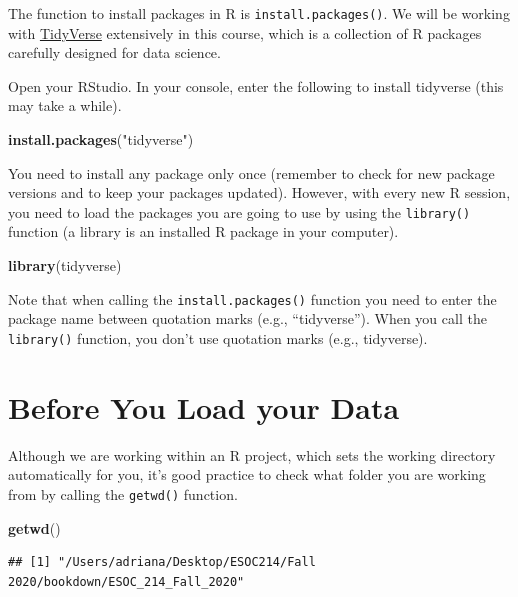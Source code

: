 \documentclass[
]{book}
\newenvironment{Shaded}{\begin{snugshade}}{\end{snugshade}}
\newcommand{\KeywordTok}[1]{\textcolor[rgb]{0.13,0.29,0.53}{\textbf{#1}}}
\newcommand{\NormalTok}[1]{#1}
\newcommand{\StringTok}[1]{\textcolor[rgb]{0.31,0.60,0.02}{#1}}
\begin{document}
The function to install packages in R is \texttt{install.packages()}. We will be working with \href{https://www.tidyverse.org/}{TidyVerse} extensively in this course, which is a collection of R packages carefully designed for data science.

Open your RStudio. In your console, enter the following to install tidyverse (this may take a while).

\begin{Shaded}
\begin{Highlighting}[]
\KeywordTok{install.packages}\NormalTok{(}\StringTok{"tidyverse"}\NormalTok{)}
\end{Highlighting}
\end{Shaded}

You need to install any package only once (remember to check for new package versions and to keep your packages updated). However, with every new R session, you need to load the packages you are going to use by using the \texttt{library()} function (a library is an installed R package in your computer).

\begin{Shaded}
\begin{Highlighting}[]
\KeywordTok{library}\NormalTok{(tidyverse)}
\end{Highlighting}
\end{Shaded}

Note that when calling the \texttt{install.packages()} function you need to enter the package name between quotation marks (e.g., ``tidyverse''). When you call the \texttt{library()} function, you don't use quotation marks (e.g., tidyverse).

\hypertarget{before-you-load-your-data}{%
\section{Before You Load your Data}\label{before-you-load-your-data}}

Although we are working within an R project, which sets the working directory automatically for you, it's good practice to check what folder you are working from by calling the \texttt{getwd()} function.

\begin{Shaded}
\begin{Highlighting}[]
\KeywordTok{getwd}\NormalTok{()}
\end{Highlighting}
\end{Shaded}

\begin{verbatim}
## [1] "/Users/adriana/Desktop/ESOC214/Fall 2020/bookdown/ESOC_214_Fall_2020"
\end{verbatim}
\end{document}
